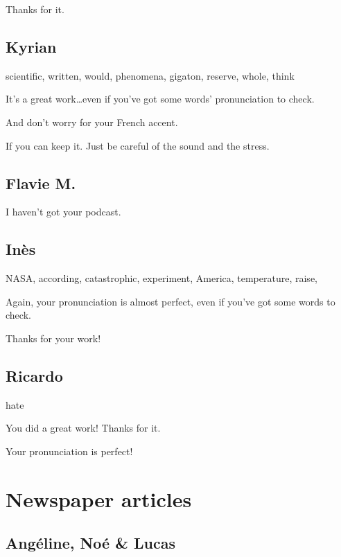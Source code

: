 \documentclass[12pt,oneside]{report}
\begin{document}
\begin{spacing}{1.2}
Thanks for it.
\color{black}

\subsection*{Kyrian}

scientific, written, would, phenomena, gigaton, reserve, whole, think

\color{blue}
It's a great work\dots even if you've got some words' pronunciation to check.

And don't worry for your French accent.

If you can keep it. Just be careful of the sound and the stress.
\color{black}

\subsection*{Flavie M.}

\color{blue}
I haven't got your podcast.
\color{black}

\subsection*{Inès}

NASA, according, catastrophic, experiment, America, temperature, raise, 

\color{blue}
Again, your pronunciation is almost perfect, even if you've got some words to check.

Thanks for your work!
\color{black}

\subsection*{Ricardo}

hate

\color{blue}
You did a great work! Thanks for it.

Your pronunciation is perfect!
\color{black}



\section{Newspaper articles}


\subsection*{Angéline, Noé \& Lucas}


\end{spacing}
\end{document}

